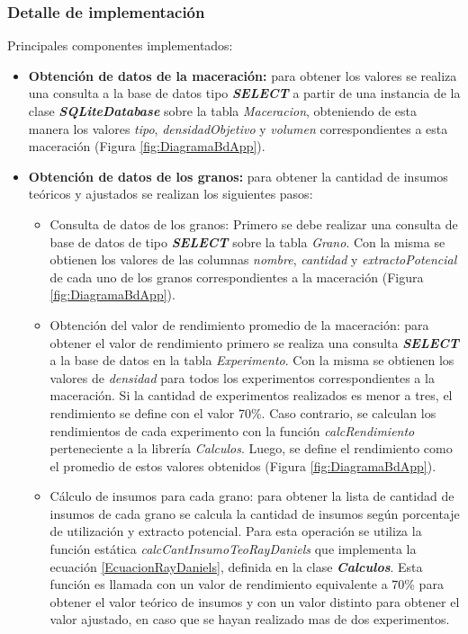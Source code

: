             \subsubsection{Detalle de implementación}
            \par Principales componentes implementados:
            \begin{itemize}
                \item \textbf{Obtención de datos de la maceración:} para obtener los valores se realiza una consulta a la base de datos tipo \textbf{ \textit{\gls{SELECT}}} a partir de una instancia de la clase \textbf{\textit{\gls{SQLiteDatabase}}} sobre la tabla \textit{Maceracion}, obteniendo de esta manera los valores \textit{tipo}, \textit{densidadObjetivo} y \textit{volumen} correspondientes a esta maceración (Figura \ref{fig:DiagramaBdApp}). 
                
                \item \textbf{Obtención de datos de los granos:} 
                    para obtener la cantidad de insumos teóricos y ajustados se realizan los siguientes pasos:
                    \begin{itemize}
                        \item Consulta de datos de los granos: Primero se debe realizar una consulta de base de datos de tipo \textbf{\textit{\gls{SELECT}}} sobre la tabla \textit{Grano}. Con la misma se obtienen los valores de las columnas \textit{nombre}, \textit{cantidad} y \textit{extractoPotencial} de cada uno de los granos correspondientes a la maceración (Figura \ref{fig:DiagramaBdApp}).
                        
                        \item Obtención del valor de rendimiento promedio de la maceración: para obtener el valor de rendimiento primero se realiza una consulta \textbf{\textit{\gls{SELECT}}} a la base de datos en la tabla \textit{Experimento}. Con la misma se obtienen los valores de \textit{densidad} para todos los experimentos correspondientes a la maceración. Si la cantidad de experimentos realizados es menor a tres, el rendimiento se define con el valor 70\%. Caso contrario, se calculan los rendimientos de cada experimento con la función \textit{calcRendimiento} perteneciente a la librería \textit{Calculos}. Luego, se define el rendimiento como el promedio de estos valores obtenidos (Figura \ref{fig:DiagramaBdApp}).
                        
                        \item Cálculo de insumos para cada grano: para obtener la lista de cantidad de insumos de cada grano se calcula la cantidad de insumos según porcentaje de utilización y extracto potencial. Para esta operación se utiliza la función estática \textit{calcCantInsumoTeoRayDaniels} que implementa la ecuación \ref{EcuacionRayDaniels}, definida en la clase \textbf{\textit{Calculos}}. Esta función es llamada con un valor de rendimiento equivalente a 70\% para obtener el valor teórico de insumos y con un valor distinto para obtener el valor ajustado, en caso que se hayan realizado mas de dos experimentos.
                        

\end{itemize}
\end{itemize}
